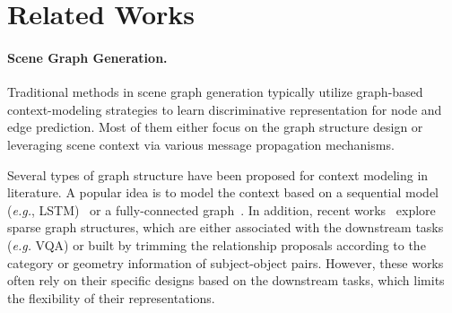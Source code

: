 \section{Related Works}

\paragraph{Scene Graph Generation.}
Traditional methods in scene graph generation typically utilize graph-based context-modeling strategies to learn discriminative representation for node and edge prediction. Most of them either focus on the graph structure design or leveraging scene context via various message propagation mechanisms. 

Several types of graph structure have been proposed for context modeling in literature. A popular idea is to model the context based on a sequential model (\textit{e.g.}, LSTM)~\cite{zellers_neural_2017} or a fully-connected graph~\cite{xu_scene_2017,dai_drnet_2017, li_scene_2017,yin_zoom-net:_2018,woo_linknet:_2018, wang_exploring_2019, lin_gps-net_2020}. 
In addition, recent works~\cite{tang_learning_2018, wang2020tackling, yang2019auto, qi_attentive_2018} explore sparse graph structures, which are either associated with the downstream tasks (\textit{e.g.} VQA) or built by trimming the relationship proposals according to the category or geometry information of subject-object pairs. However, these works often rely on their specific designs based on the downstream tasks, which limits the flexibility of their representations. 




